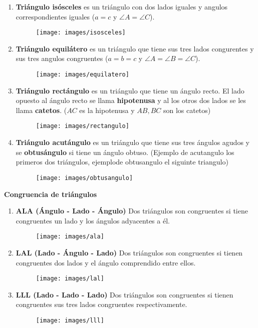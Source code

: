 \begin{enumerate}
    \item \textbf{Triángulo isósceles} es un triángulo con dos lados iguales y angulos correspondientes iguales ($a = c$ y $\angle A = \angle C$).
    \begin{figure}[htb]
        \centering
        \texttt{[image: images/isosceles]}
    \end{figure}
    \item \textbf{Triángulo equilátero} es un triángulo que tiene sus tres lados congurentes y sus tres angulos congruentes ($a = b = c$ y $\angle A = \angle B = \angle C$).
    \begin{figure}[htb]
        \centering
        \texttt{[image: images/equilatero]}
    \end{figure}
    \item \textbf{Triángulo rectángulo} es un triángulo que tiene un ángulo recto.
    El lado opuesto al ángulo recto se llama \textbf{hipotenusa} y al los otros dos lados se les llama \textbf{catetos}. ($AC$ es la hipotenusa y $AB, BC$ son los catetos)
    \begin{figure}[htb]
        \centering
        \texttt{[image: images/rectangulo]}
    \end{figure}
    \item \textbf{Triángulo acutángulo} es un triángulo que tiene sus tres ángulos agudos y se \textbf{obtusángulo} si tiene un ángulo obtuso. (Ejemplo de acutangulo los primeros dos triángulos, ejemplode obtusangulo el siguinte triangulo)
    \begin{figure}[H]
        \centering
        \texttt{[image: images/obtusangulo]}
    \end{figure}
\end{enumerate}


\textbf{Congruencia de triángulos}

\begin{enumerate}
    \item \textbf{ALA (Ángulo - Lado - Ángulo)} Dos triángulos son congruentes si tiene congruentes un lado y los ángulos adyacentes a él.
     \begin{figure}[htb]
         \centering
         \texttt{[image: images/ala]}
     \end{figure}
    \item \textbf{LAL (Lado - Ángulo - Lado)} Dos triángulos son congruentes si tienen congruentes dos lados y el ángulo comprendido entre ellos.
    \begin{figure}[htb]
        \centering
        \texttt{[image: images/lal]}
    \end{figure}
    \item \textbf{LLL (Lado - Lado - Lado)} Dos triángulos son congruentes si tienen congruentes sus tres lados congruentes respectivamente.
    \begin{figure}[htb]
        \centering
        \texttt{[image: images/lll]}
    \end{figure}
\end{enumerate}


